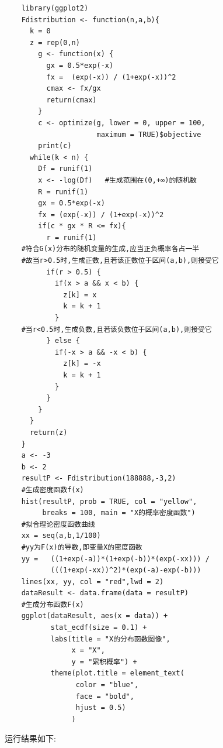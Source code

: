 \documentclass{book}
\begin{document}
\begin{lstlisting}
    library(ggplot2)
    Fdistribution <- function(n,a,b){
      k = 0
      z = rep(0,n)
        g <- function(x) {
          gx = 0.5*exp(-x)
          fx =  (exp(-x)) / (1+exp(-x))^2
          cmax <- fx/gx
          return(cmax)
        }
        c <- optimize(g, lower = 0, upper = 100, 
                      maximum = TRUE)$objective
        print(c)
      while(k < n) {
        Df = runif(1)
        x <- -log(Df)   #生成范围在(0,+∞)的随机数
        R = runif(1)
        gx = 0.5*exp(-x)
        fx = (exp(-x)) / (1+exp(-x))^2
        if(c * gx * R <= fx){
          r = runif(1)
    #符合G(x)分布的随机变量的生成,应当正负概率各占一半
    #故当r>0.5时,生成正数,且若该正数位于区间(a,b),则接受它
          if(r > 0.5) {
            if(x > a && x < b) {
              z[k] = x
              k = k + 1
            } 
    #当r<0.5时,生成负数,且若该负数位于区间(a,b),则接受它
          } else {
            if(-x > a && -x < b) {
              z[k] = -x
              k = k + 1
            } 
          }
        }
      }
      return(z) 
    }
    a <- -3
    b <- 2
    resultP <- Fdistribution(188888,-3,2)
    #生成密度函数f(x)
    hist(resultP, prob = TRUE, col = "yellow",
         breaks = 100, main = "X的概率密度函数")
    #拟合理论密度函数曲线
    xx = seq(a,b,1/100) 
    #yy为F(x)的导数,即变量X的密度函数
    yy =   ((1+exp(-a))*(1+exp(-b))*(exp(-xx))) /
           (((1+exp(-xx))^2)*(exp(-a)-exp(-b)))
    lines(xx, yy, col = "red",lwd = 2)
    dataResult <- data.frame(data = resultP)
    #生成分布函数F(x)
    ggplot(dataResult, aes(x = data)) + 
           stat_ecdf(size = 0.1) +      
           labs(title = "X的分布函数图像",
                x = "X",
                y = "累积概率") + 
           theme(plot.title = element_text(
                 color = "blue", 
                 face = "bold", 
                 hjust = 0.5)
                )
\end{lstlisting}
运行结果如下:
\end{document}
